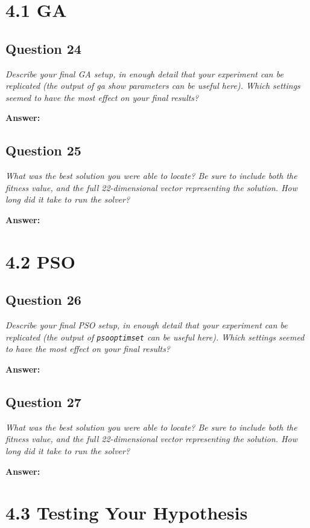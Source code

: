 \documentclass[a4paper]{article}
\begin{document}
\section*{4.1 GA}

\subsection*{Question 24}
\emph{Describe your final GA setup, in enough detail that your experiment can be replicated (the output of ga show parameters can be useful here). Which settings seemed to have the most effect on your final results?}

\textbf{Answer:}

\subsection*{Question 25}
\emph{What was the best solution you were able to locate? Be sure to
include both the fitness value, and the full 22-dimensional vector representing
the solution. How long did it take to run the solver?}

\textbf{Answer:}

\section*{4.2 PSO}

\subsection*{Question 26}
\emph{Describe your final PSO setup, in enough detail that your experiment can be replicated (the output of \texttt{psooptimset} can be useful here). Which settings seemed to have the most effect on your final results?}

\textbf{Answer:}

\subsection*{Question 27}
\emph{What was the best solution you were able to locate? Be sure to
include both the fitness value, and the full 22-dimensional vector representing the solution. How long did it take to run the solver?}

\textbf{Answer:}

\section*{4.3 Testing Your Hypothesis}
\end{document}
